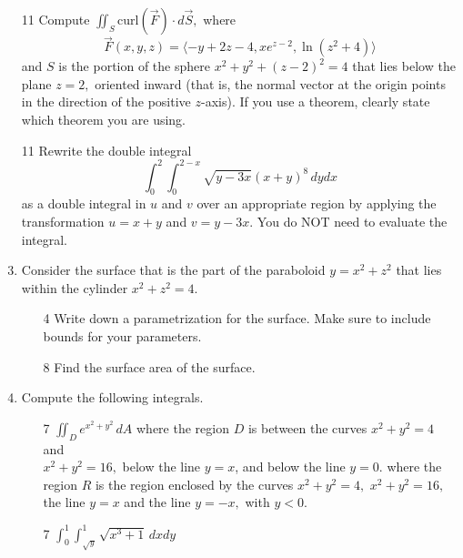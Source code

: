 \documentclass[addpoints,12pt]{exam}
\begin{document}
\begin{enumerate}
\begin{itemize}
\vfill
\end{itemize}
\newpage
\item[11] Compute $\displaystyle\iint_{S} \text{curl} (\vec{F}) \cdot d{\vec{S}},$ where
$$\vec{F}(x,y,z) = \langle -y+2z -4, xe^{z-2}, \ln(z^2+4) \rangle$$
and $S$ is the portion of the sphere $x^2+y^2+(z-2)^2 = 4$ that lies below the plane $z=2,$
oriented inward (that is, the normal vector at the origin points in the direction of the positive
$z$-axis). If you use a theorem, clearly state which theorem you are using.
\newpage
\newpage
\newpage
\item[11] Rewrite the double integral $$\displaystyle\int_0^2\int_0^{2-x}\sqrt{y-3x}(x+y)^8\,
dydx$$ as a double integral in $u$ and $v$ over an appropriate region by applying the
transformation $u = x+y$ and $v = y-3x$. You do NOT need to evaluate the integral.
\newpage
\item Consider the surface that is the part of the paraboloid $y=x^2+z^2$ that lies within the
cylinder $x^2+z^2=4.$
\begin{itemize}
\item[4] Write down a parametrization for the surface. Make sure to include bounds for your
parameters.
\vfill
\item[8] Find the surface area of the surface.
\vfill
\vfill
\vfill
\vfill
\vfill
\end{itemize}
\newpage
\item Compute the following integrals.
\medskip
\begin{itemize}
\item[7] $\displaystyle\iint_{D} e^{x^2+y^2}\, dA$ where the region $D$ is between the curves
$x^2+y^2=4$ and \\ $x^2+y^2 = 16,$ below the line $y=x$, and below the line $y=0$.
where the region $R$ is the region enclosed by the curves $x^2+y^2=4,$ $x^2+y^2 = 16,$ the
line $y=x$ and the line $y=-x,$ with $y<0.$
\vfill
\item[7] $\displaystyle\int_0^1 \int_{\sqrt{y}}^1 \sqrt{x^3+1} \, dx dy$
\vfill
\newpage

\end{itemize}
\end{enumerate}
\end{document}
